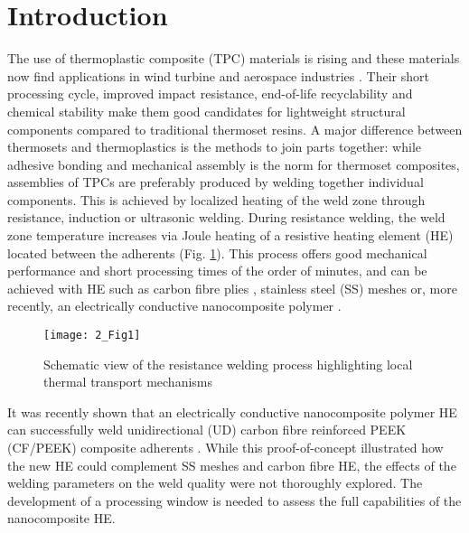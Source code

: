 \section{Introduction}

The use of thermoplastic composite (TPC) materials is rising \cite{Mathijsen2016} and these materials now find applications in wind turbine and aerospace industries \cite{Penumadu2019}. 
Their short processing cycle, improved impact resistance, end-of-life recyclability and chemical stability \cite{cogswell1992} make them good candidates for lightweight structural components compared to traditional thermoset resins. 
A major difference between thermosets and thermoplastics is the methods to join parts together: while adhesive bonding and mechanical assembly is the norm for thermoset composites, assemblies of TPCs are preferably produced by welding together individual components. 
This is achieved by localized heating of the weld zone through resistance, induction or ultrasonic welding. 
During resistance welding, the weld zone temperature increases via Joule heating of a resistive heating element (HE) located between the adherents \cite{Ageorges2001a,Stavrov2005a,Dube2007c,Shi2014,Brassard2019a,Eveno1988} (Fig. \ref{fig:2_Fig1}). 
This process offers good mechanical performance and short processing times of the order of minutes, and can be achieved with HE such as carbon fibre plies \cite{Eveno1988}, stainless steel (SS) meshes \cite{Stavrov2005a,Dube2007c,Shi2014} or, more recently, an electrically conductive nanocomposite polymer \cite{Brassard2019a}. 

\begin{figure}[ht]
	\center
	\texttt{[image: 2\_Fig1]}
	\caption{Schematic view of the resistance welding process highlighting local thermal transport mechanisms \cite{Brassard2019b}}
	\label{fig:2_Fig1}
\end{figure} 

It was recently shown that an electrically conductive nanocomposite polymer HE can successfully weld unidirectional (UD) carbon fibre reinforced PEEK (CF/PEEK) composite adherents \cite{Brassard2019a}. 
While this proof-of-concept illustrated how the new HE could complement SS meshes and carbon fibre HE, the effects of the welding parameters on the weld quality were not thoroughly explored. 
The development of a processing window is needed to assess the full capabilities of the nanocomposite HE. 

